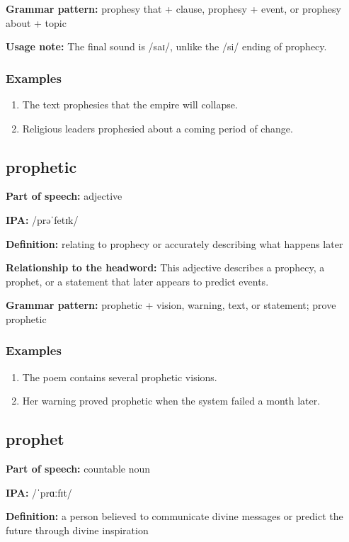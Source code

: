 \documentclass[11pt]{article}
\begin{document}
\textbf{Grammar pattern:} prophesy that + clause, prophesy + event, or prophesy about + topic

\textbf{Usage note:} The final sound is /saɪ/, unlike the /si/ ending of prophecy.

\subsubsection{Examples}
\begin{enumerate}
  \item The text prophesies that the empire will collapse.
  \item Religious leaders prophesied about a coming period of change.
\end{enumerate}

\subsection{prophetic}
\textbf{Part of speech:} adjective

\textbf{IPA:} /prəˈfetɪk/

\textbf{Definition:} relating to prophecy or accurately describing what happens later

\textbf{Relationship to the headword:} This adjective describes a prophecy, a prophet, or a statement that later appears to predict events.

\textbf{Grammar pattern:} prophetic + vision, warning, text, or statement; prove prophetic

\subsubsection{Examples}
\begin{enumerate}
  \item The poem contains several prophetic visions.
  \item Her warning proved prophetic when the system failed a month later.
\end{enumerate}

\subsection{prophet}
\textbf{Part of speech:} countable noun

\textbf{IPA:} /ˈprɑːfɪt/

\textbf{Definition:} a person believed to communicate divine messages or predict the future through divine inspiration
\end{document}
